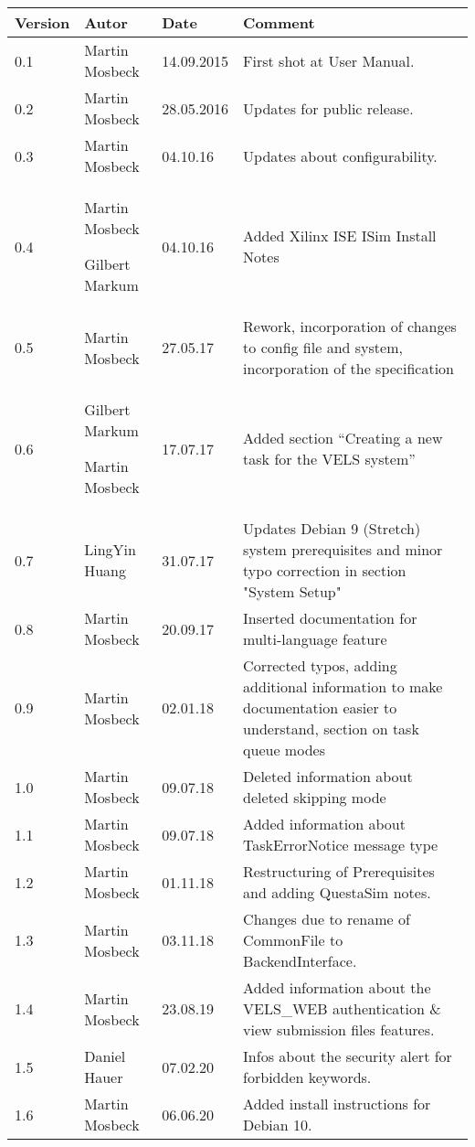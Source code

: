 
\begin{table}[h]
\begin{tabular*}{14.7cm}{|p{}|p{}|p{2cm}|p{}|}
\hline
Version & Autor & Date & Comment \\[2pt]
\hline
\hline
0.1 & Martin Mosbeck & 14.09.2015 & First shot at User Manual. \\[2pt]
\hline
0.2 & Martin Mosbeck & 28.05.2016 & Updates for public release. \\[2pt]
\hline
0.3 & Martin Mosbeck & 04.10.16 & Updates about configurability. \\[2pt]
\hline
0.4 & Martin Mosbeck \par Gilbert Markum & 04.10.16 & Added Xilinx ISE ISim Install Notes \\[2pt]
\hline
0.5 & Martin Mosbeck & 27.05.17 & Rework, incorporation of changes to config file and system, incorporation of the
specification \\[2pt]
\hline
0.6 & Gilbert Markum \par Martin Mosbeck & 17.07.17 & Added section ``Creating a new task for the VELS system'' \\[2pt]
\hline
0.7 & LingYin Huang & 31.07.17 & Updates Debian 9 (Stretch) system prerequisites and minor typo correction in section "System Setup" \\[2pt]
\hline
0.8 & Martin Mosbeck & 20.09.17 & Inserted documentation for multi-language feature \\[2pt]
\hline
0.9 & Martin Mosbeck & 02.01.18 & Corrected typos, adding additional information to make documentation easier to
understand, section on task queue modes  \\[2pt]
\hline
1.0 & Martin Mosbeck & 09.07.18 & Deleted information about deleted skipping mode \\[2pt]
\hline
1.1 & Martin Mosbeck & 09.07.18 & Added information about TaskErrorNotice message type\\[2pt]
\hline
1.2 & Martin Mosbeck & 01.11.18 & Restructuring of Prerequisites and adding QuestaSim notes.\\[2pt]
\hline
1.3 & Martin Mosbeck & 03.11.18 & Changes due to rename of CommonFile to BackendInterface.\\[2pt]
\hline
1.4 & Martin Mosbeck & 23.08.19 & Added information about the VELS\_WEB
authentication \& view submission files features.\\[2pt]
\hline
1.5 & Daniel Hauer & 07.02.20 &
Infos about the security alert for forbidden keywords.\\[2pt]
\hline
1.6 & Martin Mosbeck & 06.06.20 &
Added install instructions for Debian 10.\\[2pt]
\hline
\end{tabular*}
\end{table}

